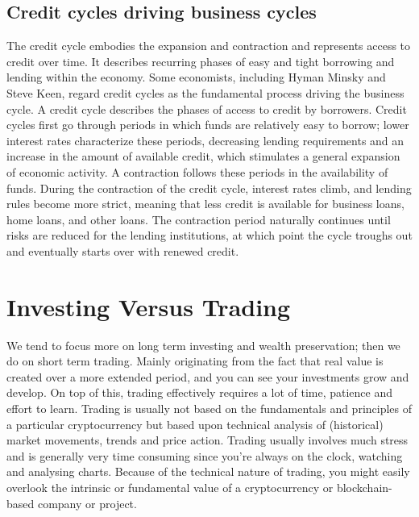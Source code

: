 \subsection{Credit cycles driving business cycles}
The credit cycle embodies the expansion and contraction and represents access to credit over time. It describes recurring phases of easy and tight borrowing and lending within the economy. Some economists, including Hyman Minsky and Steve Keen, regard credit cycles as the fundamental process driving the business cycle.
A credit cycle describes the phases of access to credit by borrowers. Credit cycles first go through periods in which funds are relatively easy to borrow; lower interest rates characterize these periods, decreasing lending requirements and an increase in the amount of available credit, which stimulates a general expansion of economic activity. A contraction follows these periods in the availability of funds. During the contraction of the credit cycle, interest rates climb, and lending rules become more strict, meaning that less credit is available for business loans, home loans, and other loans. The contraction period naturally continues until risks are reduced for the lending institutions, at which point the cycle troughs out and eventually starts over with renewed credit.


\section{Investing Versus Trading}
\label{sec:investingvstrading}

We tend to focus more on long term investing and wealth preservation; then we do on short term trading. Mainly originating from the fact that real value is created over a more extended period, and you can see your investments grow and develop. On top of this, trading effectively requires a lot of time, patience and effort to learn. Trading is usually not based on the fundamentals and principles of a particular cryptocurrency but based upon technical analysis of (historical) market movements, trends and price action. Trading usually involves much stress and is generally very time consuming since you're always on the clock, watching and analysing charts. Because of the technical nature of trading, you might easily overlook the intrinsic or fundamental value of a cryptocurrency or blockchain-based company or project.\medskip

